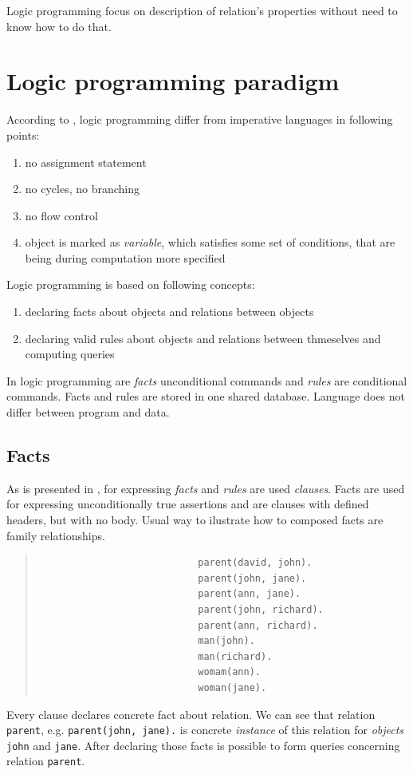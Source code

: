 \documentclass[11pt,twoside,a4paper]{book}
\begin{document}
Logic programming focus on description of relation's properties without need
to know how to do that.

\section{Logic programming paradigm}

According to \cite{nino:pls}, logic programming differ from imperative
languages in following points:
\begin{enumerate}
  \item no assignment statement
  \item no cycles, no branching 
  \item no flow control
  \item object is marked as \textit{variable}, which satisfies some set of
  conditions, that are being during computation more specified
\end{enumerate}
Logic programming is based on following concepts:
\begin{enumerate}
  \item declaring facts about objects and relations between objects
  \item declaring valid rules about objects and relations between thmeselves and
  computing queries
\end{enumerate}
In logic programming are \textit{facts} unconditional commands and
\textit{rules} are conditional commands. Facts and rules are stored in one
shared database. Language does not differ between program and data.

\newpage
\subsection{Facts}
\label{sec:facts}
As is presented in \cite{jirku:progProlog}, for expressing \textit{facts} and
\textit{rules} are used \textit{clauses}. Facts are used for expressing unconditionally true assertions and are clauses
with defined headers, but with no body. Usual way to ilustrate how to
composed facts are family relationships.

\begin{quote}
\begin{verbatim}
                            parent(david, john).
                            parent(john, jane).
                            parent(ann, jane).
                            parent(john, richard).
                            parent(ann, richard).
                            man(john).
                            man(richard).
                            womam(ann).
                            woman(jane).
\end{verbatim}
\end{quote}
Every clause declares concrete fact about relation. We can see that relation
\verb|parent|, e.g. \verb|parent(john, jane).| is concrete \textit{instance} of
this relation for \textit{objects} \verb|john| and \verb|jane|. After declaring
those facts is possible to form queries concerning relation \verb|parent|.
\end{document}

